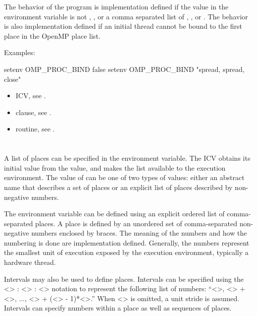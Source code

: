 The behavior of the program is implementation defined if the value in the
 environment variable is not , , 
or a comma separated list of , , or . 
The behavior is also implementation defined if an initial thread cannot be 
bound to the first place in the OpenMP place list. 

Examples:
\begin{ompEnv}
setenv OMP_PROC_BIND false
setenv OMP_PROC_BIND "spread, spread, close"
\end{ompEnv}

\crossreferences
\begin{itemize}
\item {} ICV, see .

\item {} clause, 
see .

\item {} routine, see .
\end{itemize}



\section{}
\label{sec:OMP_PLACES}
A list of places can be specified in the  environment 
variable. The  ICV obtains its initial value 
from the  value, and makes the list available to the 
execution environment. The value of  can be one of
two types of values: either an abstract name that describes a set of places 
or an explicit list of places described by non-negative numbers.

The  environment variable can be defined using an 
explicit ordered list of comma-separated places. A place is defined by 
an unordered set of comma-separated non-negative numbers enclosed by 
braces. The meaning of the numbers and how the numbering is done are 
implementation defined. Generally, the numbers represent the smallest 
unit of execution exposed by the execution environment, typically a hardware
thread.

Intervals may also be used to define places. Intervals can be specified 
using the <> : <> : <> notation 
to represent the following list of numbers: ``<>, 
<> + <>, ..., <> + 
(<> - 1)*<>.'' When <> is omitted, a 
unit stride is assumed. Intervals can specify numbers within a place as 
well as sequences of places.

